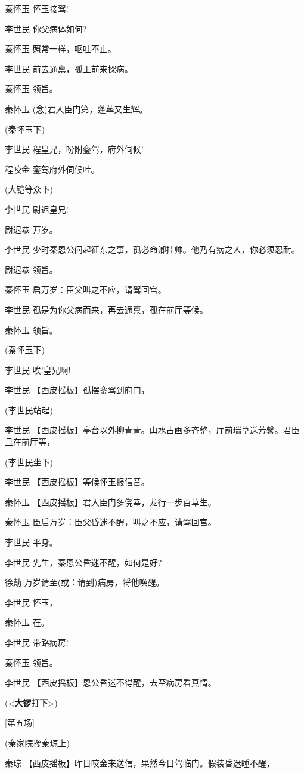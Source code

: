 秦怀玉 怀玉接驾!

李世民 你父病体如何?

秦怀玉 照常一样，呕吐不止。

李世民 前去通禀，孤王前来探病。

秦怀玉 领旨。

秦怀玉 (念)君入臣门第，蓬荜又生辉。

(秦怀玉下)

李世民 程皇兄，吩附銮驾，府外伺候!

程咬金 銮驾府外伺候哇。

(大铠等众下)

李世民 尉迟皇兄!

尉迟恭 万岁。

李世民 少时秦恩公问起征东之事，孤必命卿挂帅。他乃有病之人，你必须忍耐。

尉迟恭 领旨。

秦怀玉 启万岁：臣父叫之不应，请驾回宫。

李世民 孤是为你父病而来，再去通禀，孤在前厅等候。

秦怀玉 领旨。

(秦怀玉下)

李世民 唉!皇兄啊!

李世民 【西皮摇板】孤摆銮驾到府门，

(李世民站起)

李世民
【西皮摇板】亭台以外柳青青。山水古画多齐整，厅前瑞草送芳馨。君臣且在前厅等，

(李世民坐下)

李世民 【西皮摇板】等候怀玉报信音。

秦怀玉 【西皮摇板】君入臣门多侥幸，龙行一步百草生。

秦怀玉 臣启万岁：臣父昏迷不醒，叫之不应，请驾回宫。

李世民 平身。

李世民 先生，秦恩公昏迷不醒，如何是好?

徐勣 万岁请至(或：请到)病房，将他唤醒。

李世民 怀玉，

秦怀玉 在。

李世民 带路病房!

秦怀玉 领旨。

李世民 【西皮摇板】恩公昏迷不得醒，去至病房看真情。

(\textless{}\textbf{大锣打下}\textgreater{})

{[}第五场{]}

(秦家院搀秦琼上)

秦琼 【西皮摇板】昨日咬金来送信，果然今日驾临门。假装昏迷睡不醒，


